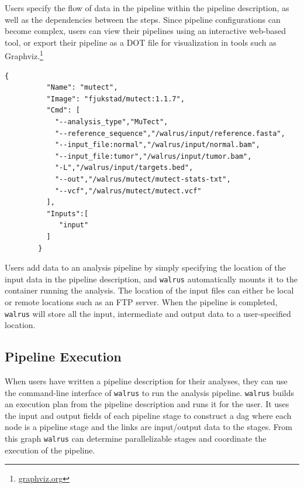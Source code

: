 Users specify the flow of data in the pipeline within the pipeline description,
as well as the dependencies between the steps. Since pipeline configurations can
become complex, users can view their pipelines using an interactive web-based
tool, or export their pipeline as a DOT file for visualization in tools such as
Graphviz.\footnote{\url{graphviz.org}}

\begin{lstlisting}[caption={Example pipeline stage for a tool that detects
somatic point mutations. It reads a reference sequence file together with both
tumor and normal sequences, and produces an output file with the detected
mutations.},
label={examplelisting}, 
basicstyle=\ttfamily\scriptsize]
        {
          "Name": "mutect",
          "Image": "fjukstad/mutect:1.1.7",
          "Cmd": [
            "--analysis_type","MuTect",
            "--reference_sequence","/walrus/input/reference.fasta",
            "--input_file:normal","/walrus/input/normal.bam",
            "--input_file:tumor","/walrus/input/tumor.bam",
            "-L","/walrus/input/targets.bed",
            "--out","/walrus/mutect/mutect-stats-txt",
            "--vcf","/walrus/mutect/mutect.vcf"
          ],
          "Inputs":[
             "input" 
          ]
        }
\end{lstlisting}

Users add data to an analysis pipeline by simply specifying the location of the
input data in the pipeline description, and \texttt{walrus} automatically mounts
it to the container running the analysis. The location of the input files can
either be local or remote locations such as an FTP server. When the pipeline is
completed, \texttt{walrus} will store all the input, intermediate and output
data to a user-specified location.  

\subsection{Pipeline Execution}
When users have written a pipeline description for their analyses, they can use
the command-line interface of \texttt{walrus} to run the analysis pipeline.
\texttt{walrus} builds an execution plan from the pipeline description and runs
it for the user. It uses the input and output fields of each pipeline stage to
construct a \gls{dag} where each node is a pipeline stage and the links are
input/output data to the stages. From this graph \texttt{walrus} can determine
parallelizable stages and coordinate the execution of the pipeline. 

